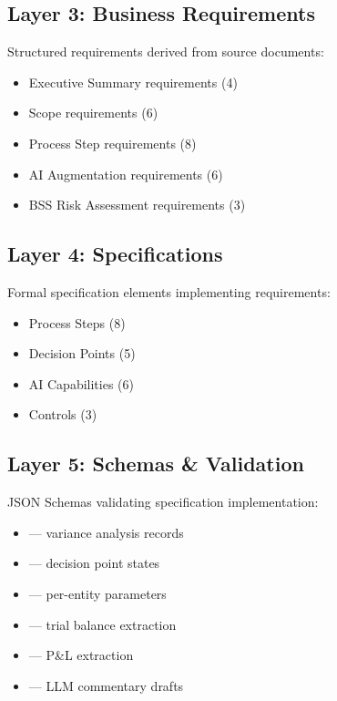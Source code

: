 \subsection{Layer 3: Business Requirements}

Structured requirements derived from source documents:
\begin{itemize}[noitemsep]
  \item Executive Summary requirements (4)
  \item Scope requirements (6)
  \item Process Step requirements (8)
  \item AI Augmentation requirements (6)
  \item BSS Risk Assessment requirements (3)
\end{itemize}

\subsection{Layer 4: Specifications}

Formal specification elements implementing requirements:
\begin{itemize}[noitemsep]
  \item Process Steps (8)
  \item Decision Points (5)
  \item AI Capabilities (6)
  \item Controls (3)
\end{itemize}

\subsection{Layer 5: Schemas \& Validation}

JSON Schemas validating specification implementation:
\begin{itemize}[noitemsep]
  \item {} --- variance analysis records
  \item {} --- decision point states
  \item {} --- per-entity parameters
  \item {} --- trial balance extraction
  \item {} --- P\&L extraction
  \item {} --- LLM commentary drafts
\end{itemize}

